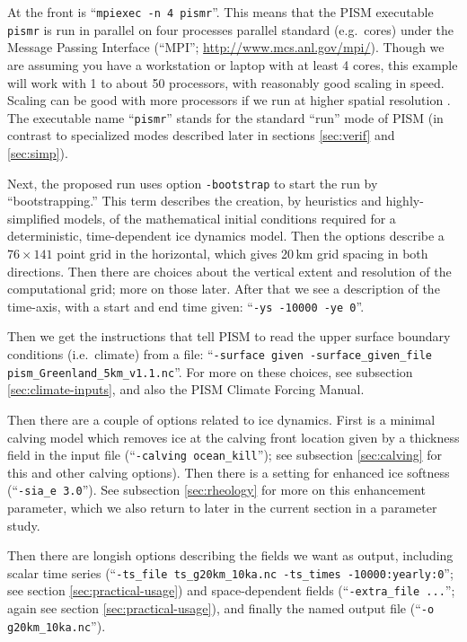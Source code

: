 At the front is ``\texttt{mpiexec -n 4 pismr}''.  This means that the PISM executable \texttt{pismr} is run in parallel on four processes parallel standard (e.g.~cores) under the Message Passing Interface (``MPI''; \url{http://www.mcs.anl.gov/mpi/}).  Though we are assuming you have a workstation or laptop with at least 4 cores, this example will work with 1 to about 50 processors, with reasonably good scaling in speed.  Scaling can be good with more processors if we run at higher spatial resolution \cite{BBssasliding,DickensMorey2013}.  The executable name ``\texttt{pismr}'' stands for the standard ``run'' mode of PISM (in contrast to specialized modes described later in sections \ref{sec:verif} and \ref{sec:simp}).

Next, the proposed run uses option \texttt{-bootstrap} to start the run by ``bootstrapping.'' This term describes the creation, by heuristics and highly-simplified models, of the mathematical initial conditions required for a deterministic, time-dependent ice dynamics model.  Then the options describe a $76\times 141$ point grid in the horizontal, which gives 20\,km grid spacing in both directions.  Then there are choices about the vertical extent and resolution of the computational grid; more on those later.  After that we see a description of the time-axis, with a start and end time given: ``\texttt{-ys -10000 -ye 0}''.

Then we get the instructions that tell PISM to read the upper surface boundary conditions (i.e.~climate) from a file: ``\texttt{-surface given -surface_given_file pism_Greenland_5km_v1.1.nc}''.  For more on these choices, see subsection \ref{sec:climate-inputs}, and also the PISM Climate Forcing Manual.

Then there are a couple of options related to ice dynamics.  First is a minimal calving model which removes ice at the calving front location given by a thickness field in the input file (``\texttt{-calving ocean_kill}''); see subsection \ref{sec:calving} for this and other calving options).  Then there is a setting for enhanced ice softness (``\texttt{-sia_e 3.0}'').  See subsection \ref{sec:rheology} for more on this enhancement parameter, which we also return to later in the current section in a parameter study.

Then there are longish options describing the fields we want as output, including scalar time series (``\texttt{-ts_file ts_g20km_10ka.nc -ts_times -10000:yearly:0}''; see section \ref{sec:practical-usage}) and space-dependent fields (``\texttt{-extra_file ...}''; again see section \ref{sec:practical-usage}), and finally the named output file (``\texttt{-o g20km_10ka.nc}'').

